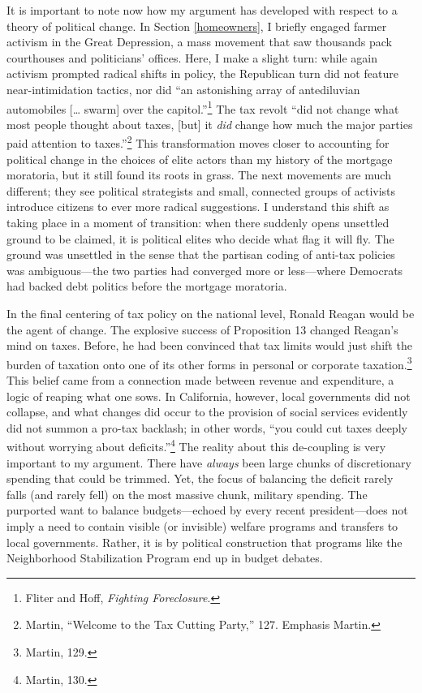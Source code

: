 \documentclass[12pt,oneside]{psthesis}
\begin{document}
It is important to note now how my argument has developed with respect to a theory of political change.
In Section \ref{homeowners}, I briefly engaged farmer activism in the Great Depression, a mass movement that saw thousands pack courthouses and politicians' offices.
Here, I make a slight turn: while again activism prompted radical shifts in policy, the Republican turn did not feature near-intimidation tactics, nor did ``an astonishing array of antediluvian automobiles {[}\ldots{} swarm{]} over the capitol.''\footnote{Fliter and Hoff, \emph{Fighting Foreclosure}.}
The tax revolt ``did not change what most people thought about taxes, {[}but{]} it \emph{did} change how much the major parties paid attention to taxes.''\footnote{Martin, ``Welcome to the Tax Cutting Party,'' 127. Emphasis Martin.}
This transformation moves closer to accounting for political change in the choices of elite actors than my history of the mortgage moratoria, but it still found its roots in grass.
The next movements are much different; they see political strategists and small, connected groups of activists introduce citizens to ever more radical suggestions.
I understand this shift as taking place in a moment of transition: when there suddenly opens unsettled ground to be claimed, it is political elites who decide what flag it will fly.
The ground was unsettled in the sense that the partisan coding of anti-tax policies was ambiguous---the two parties had converged more or less---where Democrats had backed debt politics before the mortgage moratoria.

In the final centering of tax policy on the national level, Ronald Reagan would be the agent of change.
The explosive success of Proposition 13 changed Reagan's mind on taxes.
Before, he had been convinced that tax limits would just shift the burden of taxation onto one of its other forms in personal or corporate taxation.\footnote{Martin, 129.}
This belief came from a connection made between revenue and expenditure, a logic of reaping what one sows.
In California, however, local governments did not collapse, and what changes did occur to the provision of social services evidently did not summon a pro-tax backlash; in other words, ``you could cut taxes deeply without worrying about deficits.''\footnote{Martin, 130.}
The reality about this de-coupling is very important to my argument.
There have \emph{always} been large chunks of discretionary spending that could be trimmed.
Yet, the focus of balancing the deficit rarely falls (and rarely fell) on the most massive chunk, military spending.
The purported want to balance budgets---echoed by every recent president---does not imply a need to contain visible (or invisible) welfare programs and transfers to local governments.
Rather, it is by political construction that programs like the Neighborhood Stabilization Program end up in budget debates.
\end{document}
